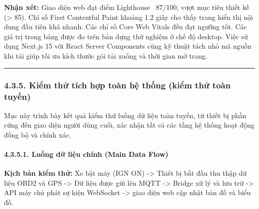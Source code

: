 \documentclass[a4paper]{extarticle}
\begin{document}
\textbf{Nhận xét:} Giao diện web đạt điểm Lighthouse ~87/100, vượt mục
 tiêu thiết kế (\textgreater{} 85). Chỉ số First Contentful Paint khoảng
1.2 giây cho thấy trang hiển thị nội dung đầu tiên khá nhanh. Các chỉ số
Core Web Vitals đều đạt ngưỡng tốt. Các giá trị trong bảng được đo trên
bản dựng thử nghiệm ở chế độ desktop. Việc sử dụng Next.js 15 với React
Server Components cùng kỹ thuật tách nhỏ mã nguồn khi tải giúp tối ưu
kích thước gói tải xuống và thời gian mở trang.

\begin{center}\rule{0.5\linewidth}{0.5pt}\end{center}

\subsubsection{4.3.5. Kiểm thử tích hợp toàn hệ thống (kiểm thử toàn
 tuyến)}\label{435-kiux1ec3m-thux1eed-tuxedch-hux1ee3p-touxe0n-hux1ec7-thux1ed1ng-end-to-end-integration-test}

Mục này trình bày kết quả kiểm thử luồng dữ liệu toàn tuyến, từ thiết bị
phần cứng đến giao diện người dùng cuối, xác nhận tất cả các tầng hệ
thống hoạt động đồng bộ và chính xác.

\paragraph{4.3.5.1. Luồng dữ liệu chính (Main Data
Flow)}\label{4351-luux1ed3ng-dux1eef-liux1ec7u-chuxednh-main-data-flow}

\textbf{Kịch bản kiểm thử:} Xe bật máy (IGN ON) -\textgreater{} Thiết bị
bắt đầu thu thập dữ liệu OBD2 và GPS -\textgreater{} Dữ liệu được
gửi lên MQTT -\textgreater{} Bridge xử lý và lưu trữ -\textgreater{}
API máy chủ phát sự kiện WebSocket -\textgreater{} giao diện web cập nhật bản đồ
và biểu đồ.
\end{document}
